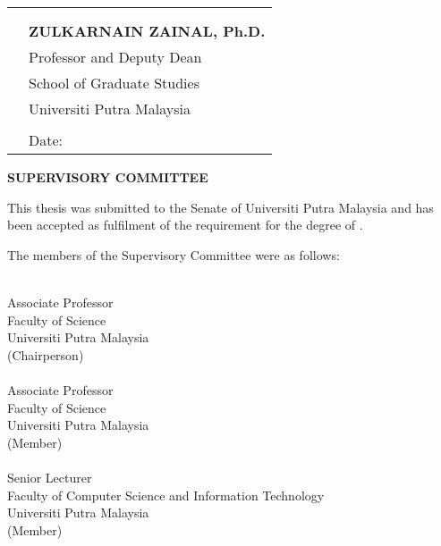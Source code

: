 \begin{singlespace}
\begin{table}[b!]
\begin{tabular}{ll}
\hspace{7cm} &                                    \\
\cline{2-2} \vspace{-.3cm}                        \\
             & {\bf{ZULKARNAIN ZAINAL, Ph.D.}}\\
             & Professor and Deputy Dean          \\
             & School of Graduate Studies         \\
             & Universiti Putra Malaysia          \\
             &                                    \\
             & Date:           \\
\end{tabular}
\end{table}

\newpage



\begin{center}
		{\bf SUPERVISORY COMMITTEE}
\end{center}
	
This thesis was submitted to the Senate of Universiti Putra
Malaysia and has been accepted as fulfilment of the requirement
for the degree of {{\degree}}.

The members of the Supervisory Committee were as follows:

{\bf{\chair }}\\
Associate Professor\\
Faculty of Science\\
Universiti Putra Malaysia\\
(Chairperson)\\

{\bf \memberA}\\
Associate Professor\\
Faculty of Science \\
Universiti Putra Malaysia\\
(Member)\\

{\bf \memberB}\\
Senior Lecturer\\
Faculty of Computer Science and Information Technology\\
Universiti Putra Malaysia\\
(Member)\\


\end{singlespace}
